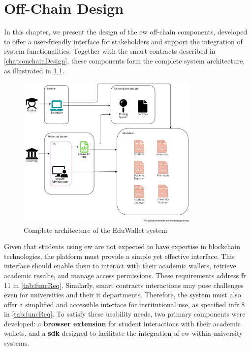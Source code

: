 \chapter{Off-Chain Design}
\label{chap:offchainDesign}
In this chapter, we present the design of the \gls{ew} off-chain components, developed to offer a user-friendly interface for stakeholders and support the integration of system functionalities. Together with the smart contracts described in \cref{chap:onchainDesign}, these components form the complete system architecture, as illustrated in \cref{fig:fullArchDiag}. 

\begin{figure}[htpb]
  \centering
  \includegraphics[width=0.8\textwidth]{figures/Architecture diagram complete.pdf}
  \caption[System architecture diagram]{Complete architecture of the EduWallet system}
  \label{fig:fullArchDiag}
\end{figure}

Given that students using \gls{ew} are not expected to have expertise in blockchain technologies, the platform must provide a simple yet effective interface. This interface should enable them to interact with their academic wallets, retrieve academic results, and manage access permissions. These requirements address \gls{fr} 11 in \cref{tab:funcReq}. Similarly, smart contracts interactions may pose challenges even for universities and their \gls{it} departments. Therefore, the system must also offer a simplified and accessible interface for institutional use, as specified in\gls{fr} 8 in \cref{tab:funcReq}. 
To satisfy these usability needs, two primary components were developed: a \textbf{browser extension} for student interactions with their academic wallets, and a \textbf{\gls{sdk}} designed to facilitate the integration of \gls{ew} within university systems.

